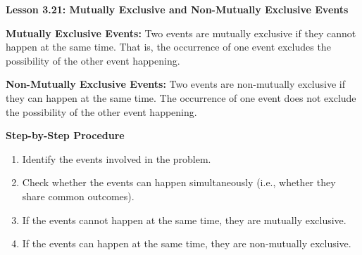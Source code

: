 \begin{center}
\textbf{Lesson 3.21: Mutually Exclusive and Non-Mutually Exclusive Events}
\end{center}

\vspace*{-1.5ex}

\noindent \textbf{Mutually Exclusive Events:} Two events are mutually exclusive if they cannot happen at the same time. That is, the occurrence of one event excludes the possibility of the other event happening. 

\noindent \textbf{Non-Mutually Exclusive Events:} Two events are non-mutually exclusive if they can happen at the same time. The occurrence of one event does not exclude the possibility of the other event happening.

\noindent\textbf{Step-by-Step Procedure}

\begin{enumerate}
    \item Identify the events involved in the problem.
    \item Check whether the events can happen simultaneously (i.e., whether they share common outcomes).
    \item If the events cannot happen at the same time, they are mutually exclusive.
    \item If the events can happen at the same time, they are non-mutually exclusive.
\end{enumerate}
